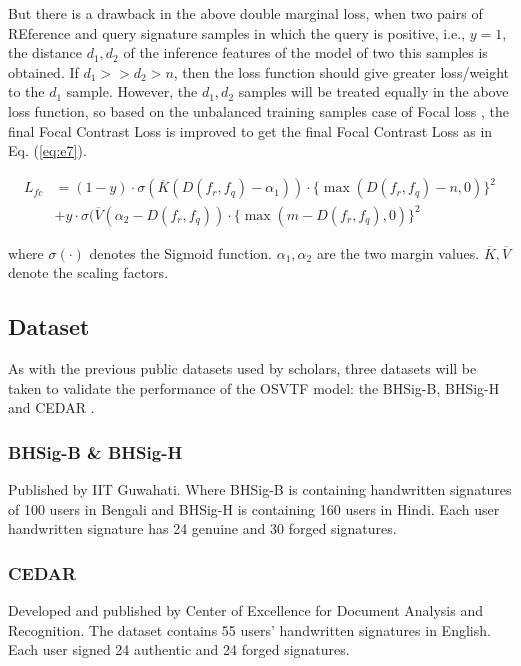 \documentclass{article}
\begin{document}
But there is a drawback in the above double marginal loss, when two pairs of REference and query signature samples in which the query is positive, i.e., $y=1$, the distance $d_1,d_2$ of the inference features of the model of two this samples is obtained. If $d_1 >> d_2 > n$, then the loss function should give greater loss/weight to the $d_1$ sample. However, the $d_1, d_2$ samples will be treated equally in the above loss function, so based on the unbalanced training samples case of Focal loss \cite{20}, the final Focal Contrast Loss is improved to get the final Focal Contrast Loss as in Eq. (\ref{eq:e7}).

\begin{equation}\label{eq:e7}
	\begin{aligned}
		L_{fc} & = (1 - y) \cdot \sigma(\overline{K}(D(f_r,f_q) - \alpha_1 )) \cdot \{\max(D(f_r, f_q) - n,0) \}^2 \\
		       & + y \cdot \sigma(\overline{V} (\alpha_2 - D(f_r,f_q )) \cdot \{\max(m - D(f_r, f_q), 0)\}^2
	\end{aligned}
\end{equation}


where $\sigma(\cdot)$ denotes the Sigmoid function. $\alpha_1, \alpha_2$ are the two margin values. $\overline{K}, \overline{V}$ denote the scaling factors.

\subsection{Dataset}

As with the previous public datasets used by scholars, three datasets will be taken to validate the performance of the OSVTF model: the BHSig-B, BHSig-H \cite{21} and CEDAR \cite{22}.

\subsubsection*{BHSig-B \& BHSig-H}

Published by IIT Guwahati. Where BHSig-B is containing handwritten signatures of 100 users in Bengali and BHSig-H is containing 160 users in Hindi. Each user handwritten signature has 24 genuine and 30 forged signatures.

\subsubsection*{CEDAR}

Developed and published by Center of Excellence for Document Analysis and Recognition. The dataset contains 55 users' handwritten signatures in English. Each user signed 24 authentic and 24 forged signatures.
\end{document}
